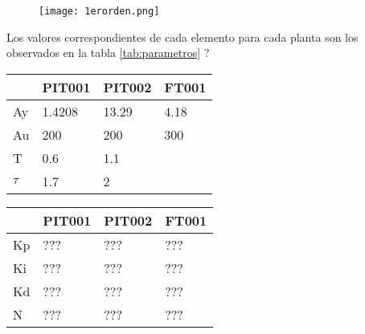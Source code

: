 \begin{figure}[htb]
	\centering
	\texttt{[image: 1erorden.png]}
	\label{fig:1erorden}
\end{figure}
Los valores correspondientes de cada elemento para cada planta son los observados en la tabla \ref{tab:parametros} 
?\\


	\begin{table}[h]
 \begin{minipage}{\linewidth}
	\centering
	\begin{minipage}{0.45\linewidth}
	
			\centering
			
			\label{tab:parametros}
			\begin{tabular}{|l|l|l|l|}
				\hline
				& PIT001 & PIT002 & FT001 \\ \hline
				Ay & 1.4208 & 13.29 & 4.18 \\ \hline
				Au & 200 & 200 & 300 \\ \hline
				T & 0.6 & 1.1 &  \\ \hline
				$\tau$ & 1.7 & 2 & \\ \hline
			\end{tabular}
	
	\end{minipage}
	\hspace{0.05\linewidth}
	\begin{minipage}{0.45\linewidth}
	
			\centering
		
			\label{tab:pid}
			\begin{tabular}{|l|l|l|l|}
				\hline
				& PIT001 & PIT002 & FT001 \\ \hline
				Kp & ??? & ??? & ??? \\ \hline
				Ki & ??? & ??? & ??? \\ \hline
				Kd & ??? & ??? & ??? \\ \hline
				N & ??? & ??? & ??? \\ \hline
			\end{tabular}

	\end{minipage}
\end{minipage}
		\end{table}










